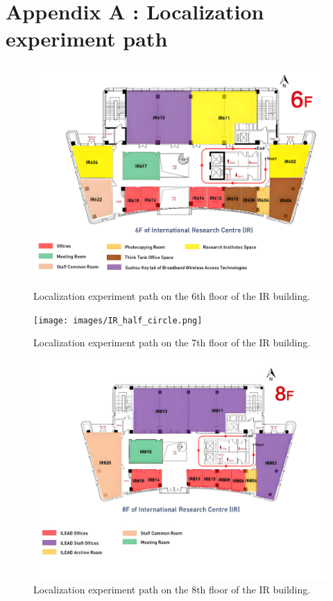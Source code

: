 \documentclass[12pt,a4paper]{article}
\numberwithin{equation}{section}
\begin{document}


\newpage
\appendix 
\section{Appendix A : Localization experiment path}
\begin{figure}[H]
    \centering
    \includegraphics[width=0.8\linewidth]{images/IR_6.drawio (1).png}
    \caption{Localization experiment path on the 6th floor of the IR building.}
    \label{fig:Localization experiment path on the 6th floor of the IR Building}
\end{figure}
\begin{figure}[H]
    \centering
    \texttt{[image: images/IR\_half\_circle.png]}
    \caption{Localization experiment path on the 7th floor of the IR building.}
    \label{fig:enter-label}
\end{figure}
\begin{figure}[H]
    \centering
    \includegraphics[width=0.9\linewidth]{images/IR_8.drawio (1).png}
    \caption{Localization experiment path on the 8th floor of the IR building.}
    \label{fig:Localization experiment path on the 8th floor of the IR Building}
\end{figure}
\end{document}
